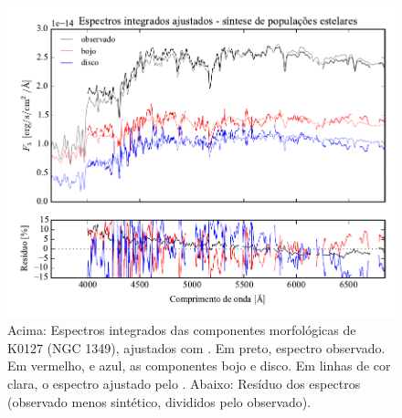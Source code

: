 \begin{figure}
	\includegraphics[page=3,width=\textwidth]{figuras/sample006a_synthesis}
	\caption[Espectros ajustados com \starlight das componentes morfológicas de
	K0127 (NGC 1349)]
	{Acima: Espectros integrados das componentes morfológicas de
	K0127 (NGC 1349), ajustados com \starlight. Em preto, espectro observado. Em
	vermelho, e azul, as componentes bojo e disco. Em linhas de cor clara, o
	espectro ajustado pelo \starlight. Abaixo: Resíduo dos espectros (observado
	menos sintético, divididos pelo observado).}
	\label{fig:decompSintese:K0127}
\end{figure}

